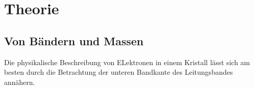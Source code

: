\section{Theorie}
\subsection{Von Bändern und Massen}%
Die physikalische Beschreibung von ELektronen in einem Kristall lässt sich am besten durch die Betrachtung der unteren Bandkante des Leitungsbandes annähern.
